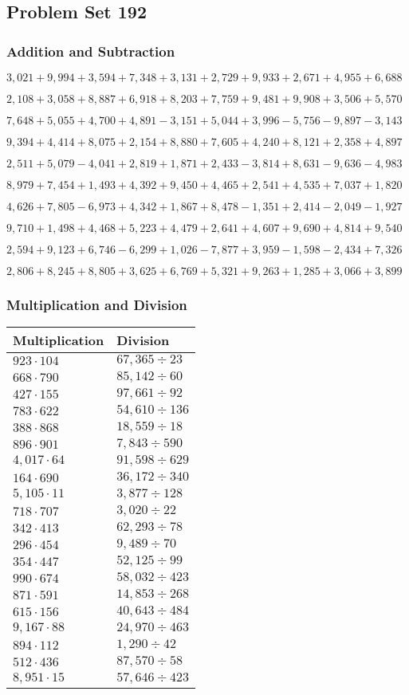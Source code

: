 \hypertarget{problem-set-192}{%
\subsection{Problem Set 192}\label{problem-set-192}}

\hypertarget{addition-and-subtraction}{%
\subsubsection{Addition and
Subtraction}\label{addition-and-subtraction}}

\(3,021+9,994+3,594+7,348+3,131+2,729+9,933+2,671+4,955+6,688\)

\(2,108+3,058+8,887+6,918+8,203+7,759+9,481+9,908+3,506+5,570\)

\(7,648+5,055+4,700+4,891-3,151+5,044+3,996-5,756-9,897-3,143\)

\(9,394+4,414+8,075+2,154+8,880+7,605+4,240+8,121+2,358+4,897\)

\(2,511+5,079-4,041+2,819+1,871+2,433-3,814+8,631-9,636-4,983\)

\(8,979+7,454+1,493+4,392+9,450+4,465+2,541+4,535+7,037+1,820\)

\(4,626+7,805-6,973+4,342+1,867+8,478-1,351+2,414-2,049-1,927\)

\(9,710+1,498+4,468+5,223+4,479+2,641+4,607+9,690+4,814+9,540\)

\(2,594+9,123+6,746-6,299+1,026-7,877+3,959-1,598-2,434+7,326\)

\(2,806+8,245+8,805+3,625+6,769+5,321+9,263+1,285+3,066+3,899\)

\hypertarget{multiplication-and-division}{%
\subsubsection{Multiplication and
Division}\label{multiplication-and-division}}

\begin{longtable}[]{@{}ll@{}}
\toprule
Multiplication & Division\tabularnewline
\midrule
\endhead
\(923\cdot104\) & \(67,365÷23\)\tabularnewline
\(668\cdot790\) & \(85,142÷60\)\tabularnewline
\(427\cdot155\) & \(97,661÷92\)\tabularnewline
\(783\cdot622\) & \(54,610÷136\)\tabularnewline
\(388\cdot868\) & \(18,559÷18\)\tabularnewline
\(896\cdot901\) & \(7,843÷590\)\tabularnewline
\(4,017\cdot64\) & \(91,598÷629\)\tabularnewline
\(164\cdot690\) & \(36,172÷340\)\tabularnewline
\(5,105\cdot11\) & \(3,877÷128\)\tabularnewline
\(718\cdot707\) & \(3,020÷22\)\tabularnewline
\(342\cdot413\) & \(62,293÷78\)\tabularnewline
\(296\cdot454\) & \(9,489÷70\)\tabularnewline
\(354\cdot447\) & \(52,125÷99\)\tabularnewline
\(990\cdot674\) & \(58,032÷423\)\tabularnewline
\(871\cdot591\) & \(14,853÷268\)\tabularnewline
\(615\cdot156\) & \(40,643÷484\)\tabularnewline
\(9,167\cdot88\) & \(24,970÷463\)\tabularnewline
\(894\cdot112\) & \(1,290÷42\)\tabularnewline
\(512\cdot436\) & \(87,570÷58\)\tabularnewline
\(8,951\cdot15\) & \(57,646÷423\)\tabularnewline
\bottomrule
\end{longtable}
